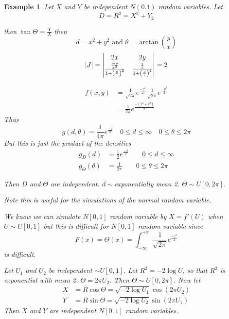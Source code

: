 \documentclass{notes}
\theoremstyle{plain}
\newtheorem*{example}{Example}
\begin{document}
\begin{example}
Let $X$ and $Y$ be independent $N(0.1)$ random variables. Let 
\[
D = R^2 = X^2 + Y_2
\]

\vspace{2in}

then $\tan \Theta = \frac{Y}{X}$ then
\[
d=x^2 + y^2 \text{ and }\theta = \arctan \left(\frac{y}{x} \right)
\]
\begin{equation}
\left|J\right| = 
\begin{vmatrix}
2x & 2y \\
\frac{\frac{-y}{x^2}}{1+\left(\frac{y}{x}\right)^2} &
 \frac{\frac{1}{x}}{1+\left(\frac{y}{x}\right)^2}
\end{vmatrix}
=2
\end{equation}

\begin{align*}
f(x,y) &= \frac{1}{\sqrt{2\pi}}e^{\frac{-x^2}{2}}
\frac{1}{\sqrt{2\pi}}e^{\frac{-y^2}{2}}\\
&=  \frac{1}{2\pi}e^{\frac{-(x^2+y^2)}{2}}
\end{align*}
Thus
\[
g(d,\theta) = \frac{1}{4\pi}e^{\frac{-d}{2}} \quad 0 \le d \le
\infty \quad 0 \le \theta \le 2\pi
\]
But this is just the product of the densities
\begin{align*}
g_D(d) &= \frac{1}{2}e^{\frac{-d}{2}} \qquad 0 \le d \le \infty\\
g_{\Theta}(\theta) &= \frac{1}{2\pi} \qquad 0 \le \theta \le 2\pi
\end{align*}

Then $D$ and $\Theta$ are independent. $d \sim$exponentially mean 2. 
$\Theta \sim U[0,2\pi]$.

\emph{Note} this is useful for the simulations of the normal random variable.

We know we can simulate $N[0,1]$ random variable by $X = f'(U)$
when $ U\sim U[0,1]$ but this is difficult for $N [0,1]$ random
variable since
\[
F(x) = \Theta(x) = \int_{-\infty}^{+x}\frac{1}{\sqrt{2\pi}}e^{\frac{-z^2}{2}}
\]
is difficult.

Let $U_1$ and $U_2$ be independent $\sim U[0,1]$. Let $ R^2 =
-2\log{U}$, so that $R^2$ is exponential with mean 2. $\Theta =
2\pi U_2$. Then $\Theta \sim U[0,2\pi]$. Now let
\begin{align*}
X&= R\cos \Theta = \sqrt{-2\log U_1}\cos(2\pi U_2)\\
Y&= R\sin \Theta = \sqrt{-2\log U_2}\sin(2\pi U_1)
\end{align*}
Then $X$ and $Y$ are independent $N[0,1]$ random variables.
\end{example}
\end{document}
